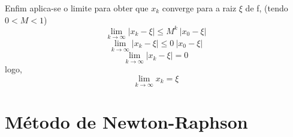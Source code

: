 \newpage

Enfim aplica-se o limite para obter que $x_k$ converge para a raiz $\xi$ de f, (tendo $0 < M < 1$)
\[ \lim_{k \to \infty} |x_k - \xi| \leq M^k \ |x_0 - \xi|\]
\[ \lim_{k \to \infty} |x_k - \xi| \leq 0 \ |x_0 - \xi|\]
\[ \lim_{k \to \infty} |x_k - \xi| = 0 \] logo,
\begin{equation}
    \lim_{k \to \infty} x_k = \xi \label{conv.mpf}
\end{equation}

    
\section{Método de Newton-Raphson}

